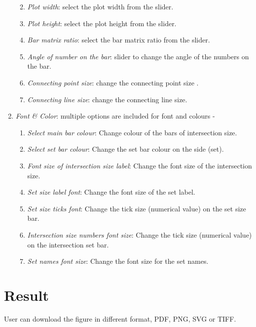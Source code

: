 \documentclass[
  a4paper,
  oneside,
  open=any]{scrreport}
\begin{document}
\begin{enumerate}
  \begin{enumerate}
  \def\labelenumii{\roman{enumii}.}
  \setcounter{enumii}{6}
  \item
    \emph{Plot width}: select the plot width from the slider.
  \item
    \emph{Plot height}: select the plot height from the slider.
  \item
    \emph{Bar matrix ratio}: select the bar matrix ratio from the
    slider.
  \item
    \emph{Angle of number on the bar}: slider to change the angle of the
    numbers on the bar.
  \item
    \emph{Connecting point size}: change the connecting point size .
  \item
    \emph{Connecting line size}: change the connecting line size.
  \end{enumerate}
\item
  \emph{Font \& Color}: multiple options are included for font and
  colours -

  \begin{enumerate}
  \def\labelenumii{\roman{enumii}.}
  \item
    \emph{Select main bar colour}: Change colour of the bars of
    intersection size.
  \item
    \emph{Select set bar colour}: Change the set bar colour on the side
    (set).
  \item
    \emph{Font size of intersection size label}: Change the font size of
    the intersection size.
  \item
    \emph{Set size label font}: Change the font size of the set label.
  \item
    \emph{Set size ticks font}: Change the tick size (numerical value)
    on the set size bar.
  \item
    \emph{Intersection size numbers font size}: Change the tick size
    (numerical value) on the intersection set bar.
  \item
    \emph{Set names font size}: Change the font size for the set names.
  \end{enumerate}
\end{enumerate}

\hypertarget{result}{%
\section{Result}\label{result}}

User can download the figure in different format, PDF, PNG, SVG or TIFF.
\end{document}
